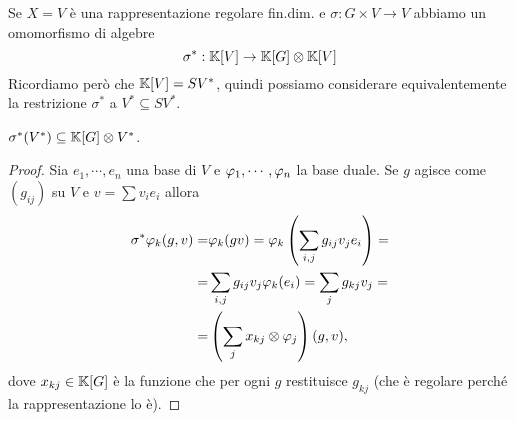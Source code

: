 \begin{remark}
Se $X=V$ \`e una rappresentazione regolare fin.dim. e $\sigma:G\times V\to V$ abbiamo un omomorfismo di algebre
\[\sigma^\ast:\mathbb{K}[V]\to \mathbb{K}[G]\otimes\mathbb{K}[V]\]
Ricordiamo per\`o che $\mathbb{K}[V]=SV^\ast$, quindi possiamo considerare equivalentemente la restrizione $\sigma^\ast$ a $V^\ast\subseteq SV^\ast$.
\end{remark}

\begin{lemma}
$\sigma^\ast(V^\ast)\subseteq \mathbb{K}[G]\otimes V^\ast$.
\end{lemma}
\begin{proof}
Sia $e_1,\cdots, e_n$ una base di $V$ e $\varphi_1,\cdots, \varphi_n$ la base duale. Se $g$ agisce come $(g_{ij})$ su $V$ e $v=\sum v_ie_i$ allora
\begin{align*}
    \sigma^\ast \varphi_k(g,v)=&\varphi_k(gv)=\varphi_k\left({\sum_{i,j} g_{ij}v_je_i}\right)=\\
    =&\sum_{i,j} g_{ij}v_j\varphi_k(e_i)=\sum_j g_{kj}v_j=\\
    =&\left({\sum_j x_{kj}\otimes \varphi_j}\right)(g,v),
\end{align*}
dove $x_{kj}\in \mathbb{K}[G]$ \`e la funzione che per ogni $g$ restituisce $g_{kj}$ (che \`e regolare perch\'e la rappresentazione lo \`e).
\end{proof}


